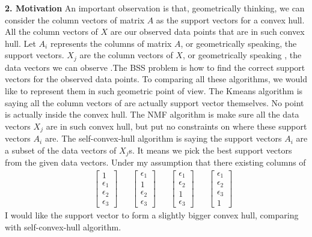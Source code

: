 \documentclass[14pt]{book}
\begin{document}
{\bf 2. Motivation}
An important observation is that, geometrically thinking, we can consider the column vectors of matrix $A$ as the support vectors for a convex hull. All the column vectors of $X$ are our observed data points that are in such convex hull. Let $A_i$ represents the columns of matrix $A$, or geometrically speaking, the support vectors. $X_j$ are the column vectors of $X$, or geometrically speaking , the data vectors we can observe .The BSS problem is how to find the correct support vectors for the observed data points. To comparing all these algorithms, we would like to represent them in such geometric point of view. The  Kmeans algorithm is saying all the column vectors of are actually support vector themselves. No point is actually inside the convex hull. The NMF algorithm is make sure all the data vectors  $X_j$ are in such convex hull, but put no constraints on where these support vectors $A_i$ are. The self-convex-hull algorithm is saying the support vectors $A_i$ are a subset of the data vectors of $X_j$s. It means we pick the best support vectors from the given data vectors. Under my assumption that there existing columns of 
\begin{equation}
\begin{aligned}
& &\begin{bmatrix}
1\\ 
\epsilon_1\\ 
\epsilon_2\\ 
\epsilon_3
\end{bmatrix}
& & \begin{bmatrix}
\epsilon_1\\ 
1\\ 
\epsilon_2\\ 
\epsilon_3
\end{bmatrix}
& & \begin{bmatrix}
\epsilon_1\\ 
\epsilon_2\\ 
1\\ 
\epsilon_3
\end{bmatrix}
& & \begin{bmatrix}
\epsilon_1\\ 
\epsilon_2\\ 
\epsilon_3\\ 
1
\end{bmatrix}
\end{aligned}
\end{equation}
I would like the support vector to form a slightly bigger convex hull, comparing with self-convex-hull algorithm. 
\end{document}
